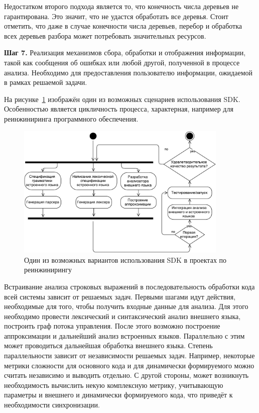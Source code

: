 Недостатком второго подхода является то, что конечность числа деревьев не гарантирована. Это значит, что не удастся обработать все деревья. Стоит отметить, что даже в случае конечности числа деревьев, перебор и обработка всех деревьев разбора может потребовать значительных ресурсов.


\textbf{Шаг 7.} Реализация механизмов сбора, обработки и отображения информации, такой как сообщения об ошибках или любой другой, полученной в процессе анализа. Необходимо для предоставления пользователю информации, ожидаемой в рамках решаемой задачи.

На рисунке~\ref{fig:activMethod} изображён один из возможных сценариев использования SDK. Особенностью является цикличность процесса, характерная, например для реинжиниринга программного обеспечения.

\begin{figure}[h!]
\begin{center}
\includegraphics[width=0.9\textwidth]{pics/ActivMethodology}
\caption{Один из возможных вариантов использования SDK в проектах по реинжинирингу}
\label{fig:activMethod} 
\end{center}
\end{figure}

Встраивание анализа строковых выражений в последовательность обработки кода всей системы зависит от решаемых задач. Первыми шагами идут действия, необходимые для того, чтобы получить входные данные для анализа. Для этого необходимо провести лексический и синтаксический анализ внешнего языка, построить граф потока управления. После этого возможно построение аппроксимации и дальнейший анализ встроенных языков. Параллельно с этим может проводиться дальнейшая обработка внешнего языка. Степень параллельности зависит от независимости решаемых задач. Например, некоторые метрики сложности для основного кода и для динамически формируемого можно считать независимо и выводить отдельно. С другой стороны, может возникнуть необходимость вычислить некую комплексную метрику, учитывающую параметры и внешнего и динамически формируемого кода, что приведёт к необходимости синхронизации.

